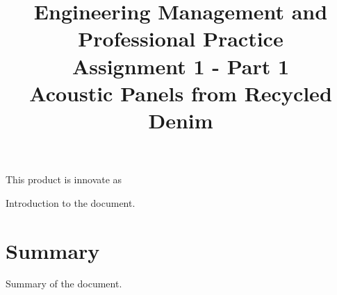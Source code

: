 \documentclass[conference]{IEEEtran}
\begin{document}
\title{Engineering Management and Professional Practice \\
Assignment 1 - Part 1 \\
Acoustic Panels from Recycled Denim \\
}

\author{
}


\maketitle




This product is innovate as 

Introduction to the document.

\section{Summary}
Summary of the document.

% 
% 
\end{document}
